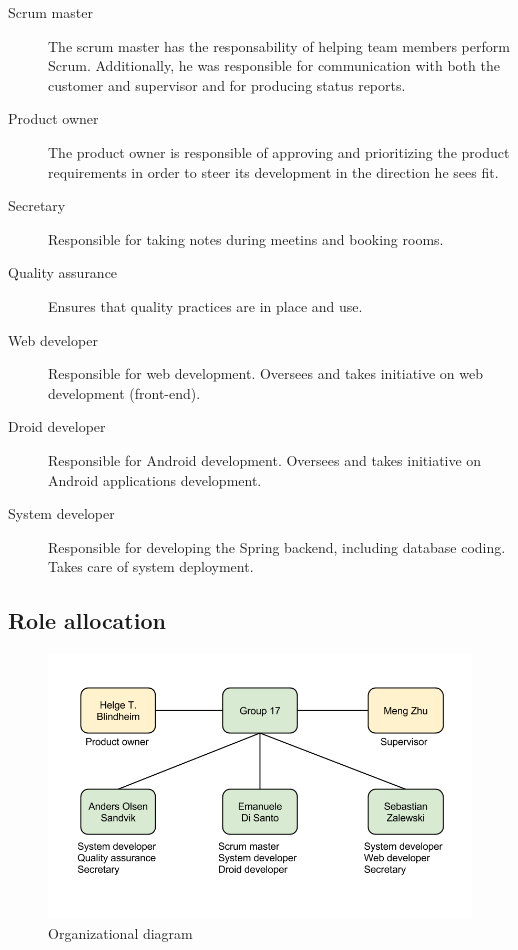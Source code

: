 \begin{description}

\item[Scrum master]
The scrum master has the responsability of helping team members perform Scrum.
Additionally, he was responsible for communication with both the customer and supervisor
and for producing status reports.
\item[Product owner]
The product owner is responsible of approving and prioritizing the product
requirements in order to steer its development in the direction he sees fit.
\item[Secretary]
Responsible for taking notes during meetins and booking rooms.
\item[Quality assurance]
Ensures that quality practices are in place and use.
\item[Web developer]
Responsible for web development. Oversees and takes initiative on web development (front-end).
\item[Droid developer]
Responsible for Android development. Oversees and takes initiative on Android applications development.
\item[System developer]
Responsible for developing the Spring backend, including database coding. Takes care of system deployment.
\end{description}

\subsection{Role allocation}

\begin{figure}[H]
\includegraphics[scale=0.5]{../Figures/organizational-diagram.png}
\caption{Organizational diagram}
\label{figure:orgdia}
\end{figure}

